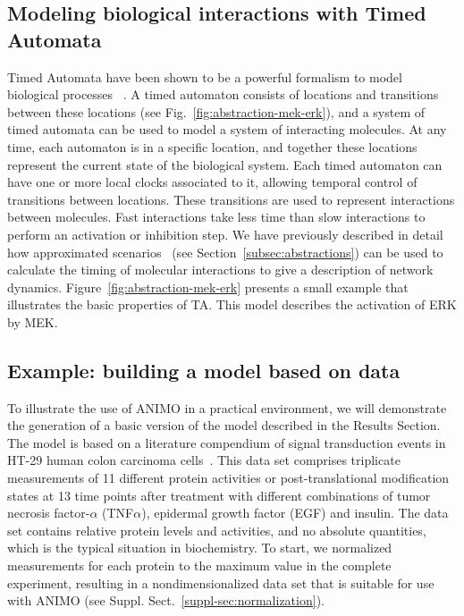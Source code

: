 \documentclass{bmcart}
\def\ta{Timed Automaton}
\def\tas{Timed Automata}
\begin{document}
\subsection*{Modeling biological interactions with Timed Automata}\label{subsec:timed-automata}
\def\ta{TA}
\def\tas{TA}

Timed Automata have been shown to be a powerful formalism to model biological processes
~\cite{ta-siebert,bartocci-oscillators,oded-ode-ta-discretization}. A timed automaton consists of locations
and transitions between these locations (see Fig.~\ref{fig:abstraction-mek-erk}), and a system of timed automata can be
used to model a system of interacting molecules. At any time, each automaton is in a specific location, and together
these locations represent the current state of the biological system. Each timed automaton can have one or more local clocks
associated to it, allowing temporal control of transitions between locations. These transitions are used to
represent interactions between molecules. Fast interactions take less time than slow interactions
to perform an activation or inhibition step. We have previously described in detail how approximated
scenarios~\cite{animo-ieee} (see Section~\ref{subsec:abstractions}) can be used to calculate the timing of molecular
interactions to give a description of network dynamics. Figure~\ref{fig:abstraction-mek-erk}
presents a small example that illustrates the basic properties of \tas.
This model describes the activation of ERK by MEK.




\subsection*{Example: building a model based on data}\label{subsec:case-study}
To illustrate the use of ANIMO in a practical environment, we will demonstrate the generation of a basic
version of the model described in the Results Section. The model is based on a literature compendium of
signal transduction events in HT-29 human colon carcinoma cells~\cite{pathway-compendium}. This data set comprises triplicate
measurements of 11 different protein activities or post-translational modification states at 13 time points after
treatment with different combinations of tumor necrosis factor-$\alpha$ (TNF$\alpha$), epidermal growth factor (EGF) and insulin.
The data set contains relative protein levels and activities, and no absolute quantities, which is the typical situation in biochemistry.
To start, we normalized measurements for each protein to the
maximum value in the complete experiment, resulting in a nondimensionalized data set that is suitable for use with ANIMO (see Suppl. Sect.~\ref{suppl-sec:normalization}).
\end{document}
